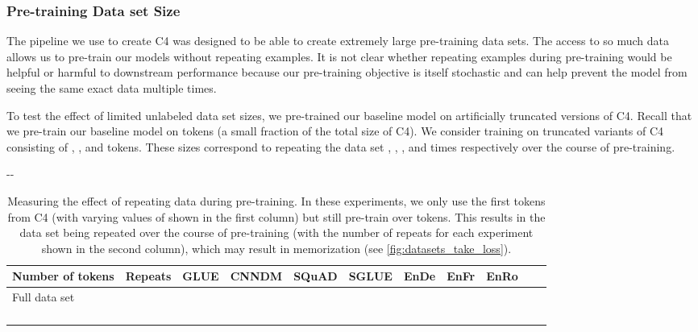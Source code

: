 \documentclass[twoside,11pt]{article}
\newlength{\offsetpage}
\newenvironment{widepage}{\begin{adjustwidth}{-\offsetpage}{-\offsetpage}\addtolength{\textwidth}{2\offsetpage}}{\end{adjustwidth}}
\newcommand{\bsl}{\makebox[0pt][r]{\raisebox{0.05em}{}}}
\begin{document}
\subsubsection{Pre-training Data set Size}
\label{sec:datasets_take}

The pipeline we use to create C4 was designed to be able to create extremely large pre-training data sets.
The access to so much data allows us to pre-train our models without repeating examples.
It is not clear whether repeating examples during pre-training would be helpful or harmful to downstream performance because our pre-training objective is itself stochastic and can help prevent the model from seeing the same exact data multiple times.

To test the effect of limited unlabeled data set sizes, we pre-trained our baseline model on artificially truncated versions of C4.
Recall that we pre-train our baseline model on  tokens (a small fraction of the total size of C4).
We consider training on truncated variants of C4 consisting of , ,  and  tokens.
These sizes correspond to repeating the data set , , , and  times respectively over the course of pre-training.

\begin{table}
\footnotesize
\begin{widepage}
\centering
\begin{tabular}{l c c c c c c c c c c}
\toprule
    Number of tokens   & Repeats   & GLUE        & CNNDM       & SQuAD       & SGLUE       & EnDe        & EnFr        & EnRo    \\
\midrule
    \bsl Full data set  &        &  &  &  &  &  &  &  \\
               &       &  &  &  &  &  &  &  \\
               &      &      &  &      &      &  &  &  \\
               &  &      &      &      &      &      &      &  \\
               &  &      &      &      &      &      &      &  \\
\bottomrule
\end{tabular}
\end{widepage}
\caption{
Measuring the effect of repeating data during pre-training.
In these experiments, we only use the first  tokens from C4 (with varying values of  shown in the first column) but still pre-train over  tokens.
This results in the data set being repeated over the course of pre-training (with the number of repeats for each experiment shown in the second column), which may result in memorization (see \cref{fig:datasets_take_loss}).
}
\label{tab:datasets_take}
\end{table}
\end{document}
